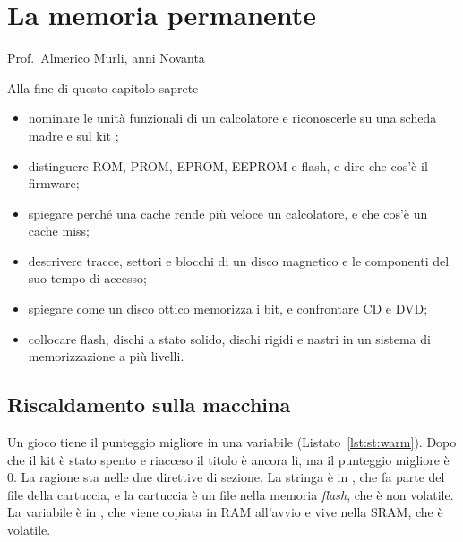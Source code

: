 \chapter{La memoria permanente}
\label{ch:storage}

  {Prof.\ Almerico Murli, anni Novanta}

\begin{chapgoals}
Alla fine di questo capitolo saprete
\begin{itemize}
\item nominare le unità funzionali di un calcolatore e riconoscerle su una scheda madre e sul kit \prg;
\item distinguere ROM, PROM, EPROM, EEPROM e flash, e dire che cos'è il firmware;
\item spiegare perché una cache rende più veloce un calcolatore, e che cos'è un cache miss;
\item descrivere tracce, settori e blocchi di un disco magnetico e le componenti del suo tempo di accesso;
\item spiegare come un disco ottico memorizza i bit, e confrontare CD e DVD;
\item collocare flash, dischi a stato solido, dischi rigidi e nastri in un sistema di memorizzazione a più livelli.
\end{itemize}
\end{chapgoals}


\section{Riscaldamento sulla macchina}


Un gioco tiene il punteggio migliore in una variabile
(Listato~\ref{lst:st:warm}). Dopo che il kit è stato spento e riacceso il
titolo è ancora lì, ma il punteggio migliore è 0. La ragione sta nelle due
direttive di sezione. La stringa è in , che fa parte del file
della cartuccia, e la cartuccia è un file nella memoria \emph{flash}, che è
non volatile. La variabile è in , che viene copiata in RAM
all'avvio e vive nella SRAM, che è volatile.


